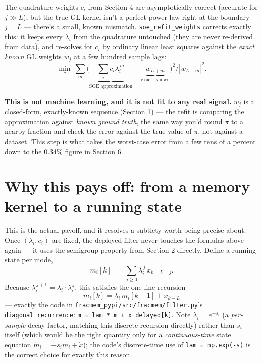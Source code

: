 \documentclass[11pt]{article}
\begin{document}
The quadrature weights $c_i$ from Section 4 are asymptotically correct (accurate for $j\gg L$), but the true GL kernel isn't a perfect power law right at the boundary $j=L$ --- there's a small, known mismatch. \texttt{soe\_refit\_weights} corrects exactly this: it keeps every $\lambda_i$ from the quadrature untouched (they are never re-derived from data), and re-solves for $c_i$ by ordinary linear least squares against the \emph{exact known} GL weights $w_j$ at a few hundred sample lags:
\[
\min_{c}\ \sum_{m} \Big(\underbrace{\textstyle\sum_i c_i \lambda_i^{\,m}}_{\text{SOE approximation}} - \underbrace{w_{L+m}}_{\text{exact, known}}\Big)^2 \Big/ |w_{L+m}|^2.
\]

\begin{keyidea}
\textbf{This is not machine learning, and it is not fit to any real signal.} $w_j$ is a closed-form, exactly-known sequence (Section 1) --- the refit is comparing the approximation against \emph{known ground truth}, the same way you'd round $\pi$ to a nearby fraction and check the error against the true value of $\pi$, not against a dataset. This step is what takes the worst-case error from a few tens of a percent down to the 0.34\% figure in Section 6.
\end{keyidea}

\section{Why this pays off: from a memory kernel to a running state}

This is the actual payoff, and it resolves a subtlety worth being precise about. Once $(\lambda_i, c_i)$ are fixed, the deployed filter never touches the formulas above again --- it uses the semigroup property from Section 2 directly. Define a running state per mode,
\[
m_i[k] \;=\; \sum_{j\ge 0} \lambda_i^{\,j}\, x_{k-L-j}.
\]
Because $\lambda_i^{\,j+1} = \lambda_i \cdot \lambda_i^{\,j}$, this satisfies the one-line recursion
\[
\boxed{\,m_i[k] = \lambda_i\, m_i[k-1] + x_{k-L}\,}
\]
--- exactly the code in \texttt{fracmem\_pypi/src/fracmem/filter.py}'s \texttt{diagonal\_recurrence}: \texttt{m = lam * m + x\_delayed[k]}. Note $\lambda_i = e^{-s_i}$ (a \emph{per-sample} decay factor, matching this discrete recursion directly) rather than $s_i$ itself (which would be the right quantity only for a \emph{continuous-time} state equation $\dot m_i = -s_i m_i + \dot x$); the code's discrete-time use of \texttt{lam = np.exp(-s)} is the correct choice for exactly this reason.
\end{document}
